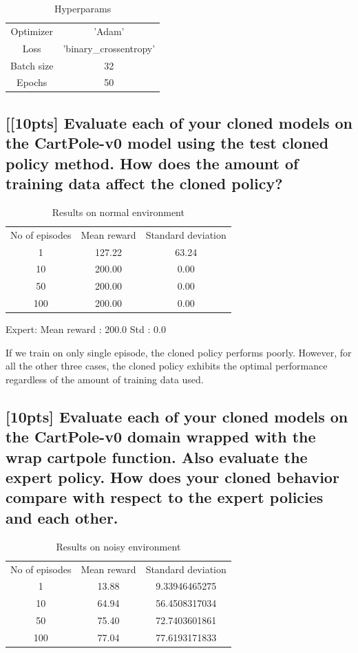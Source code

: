 \documentclass{article}
\begin{document}
\begin{table}[H]
\centering
\caption{Hyperparams}
\label{my-label2}
\begin{tabular}{cc}
Optimizer  & 'Adam'                 \\
Loss       & 'binary\_crossentropy' \\
Batch size & 32                     \\
Epochs     & 50                    
\end{tabular}
\end{table}


\subsection{[[10pts] Evaluate each of your cloned models on the CartPole-v0 model using the test cloned policy method. How does the amount of training data affect the cloned policy?}

\begin{table}[H]
\centering
\caption{Results on normal environment}
\label{my-label3}
\begin{tabular}{ccc}
No of episodes & Mean reward & Standard deviation \\
1              & 127.22       & 63.24    \\
10            & 200.00       & 0.00      \\
50            & 200.00       & 0.00    \\
100          & 200.00       & 0.00     
\end{tabular}
\end{table}

Expert:
Mean reward : 200.0
Std : 0.0

If we train on only single episode, the cloned policy performs poorly. However, for all the other three cases, the cloned policy exhibits the optimal performance regardless of the amount of training data used. 

\subsection{[10pts] Evaluate each of your cloned models on the CartPole-v0 domain wrapped with the wrap cartpole function. Also evaluate the expert policy. How does your cloned behavior compare with respect to the expert policies and each other.}

\begin{table}[H]
\centering
\caption{Results on noisy environment}
\label{my-label4}
\begin{tabular}{ccc}
No of episodes & Mean reward & Standard deviation \\
1            & 13.88       & 9.33946465275      \\
10           & 64.94       & 56.4508317034      \\
50           & 75.40       & 72.7403601861      \\
100          & 77.04       & 77.6193171833      
\end{tabular}
\end{table}
\end{document}
